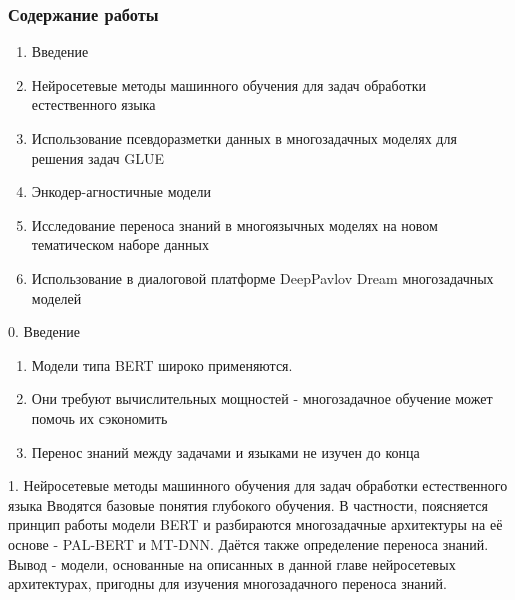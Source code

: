 \begin{frame}
\frametitle{Содержание работы}
\begin{enumerate}
    \item {Введение}
    \item {Нейросетевые методы машинного обучения для задач обработки естественного языка}
    \item {Использование псевдоразметки данных в многозадачных моделях для решения задач GLUE}
    \item {Энкодер-агностичные модели}
    \item {Исследование переноса знаний в многоязычных моделях на новом тематическом наборе данных}
    \item {Использование в диалоговой платформе {DeepPavlov Dream} многозадачных моделей}
\end{enumerate}
\end{frame}

\begin{frame}{0. Введение}
\begin{enumerate}
\item Модели типа BERT широко применяются.
\item Они требуют вычислительных мощностей - многозадачное обучение может помочь их сэкономить
\item Перенос знаний между задачами и языками не изучен до конца
\end{enumerate}
\end{frame}

\begin{frame}{1. Нейросетевые методы машинного обучения  для задач обработки естественного языка}
Вводятся базовые понятия глубокого обучения. В частности, поясняется принцип работы модели BERT и разбираются многозадачные архитектуры на её основе - PAL-BERT и MT-DNN. Даётся также определение переноса знаний.
\newline
\newline
Вывод - модели, основанные на описанных в данной главе нейросетевых архитектурах, пригодны для изучения многозадачного переноса знаний.
\end{frame}

